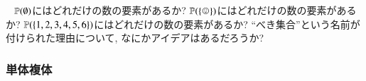 \begin{exercise}\label{exc:size of power sets}~
\sexc ${\mathbb P}(\emptyset)$にはどれだけの数の要素があるか?
\next $\PP(\singleton)$にはどれだけの数の要素があるか?
\next ${\mathbb P}(\{1,2,3,4,5,6\})$にはどれだけの数の要素があるか?
\next ``べき集合''という名前が付けられた理由について, なにかアイデアはあるだろうか?
\endsexc
\end{exercise}


\subsubsection{単体複体}\label{sec:simplicial complex}


